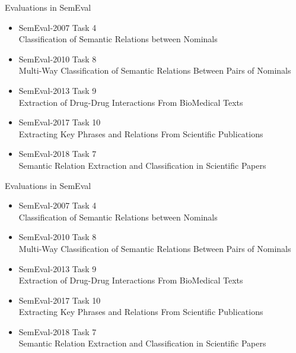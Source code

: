 \documentclass[xcolor={dvipsnames}]{beamer}
\begin{document}
\begin{frame}{\insertsection}

\begin{exampleblock}{Evaluations in SemEval}
		\begin{itemize}
			\small 
			\item SemEval-2007 Task 4 \\ Classification of Semantic Relations between Nominals
			\item SemEval-2010 Task 8 \\ Multi-Way Classification of Semantic Relations Between Pairs of Nominals
			\item SemEval-2013 Task 9 \\ Extraction of Drug-Drug Interactions From BioMedical Texts
			\item SemEval-2017 Task 10 \\ Extracting Key Phrases and Relations From Scientific Publications
			\item SemEval-2018 Task 7 \\ Semantic Relation Extraction and Classification in Scientific Papers
		\end{itemize}
\end{exampleblock}
\end{frame}

\begin{frame}{\insertsection}

\begin{exampleblock}{Evaluations in SemEval}
		\begin{itemize}
			\small 
			\item SemEval-2007 Task 4 \\ Classification of Semantic Relations between Nominals
			\item \alert{SemEval-2010 Task 8 \\ Multi-Way Classification of Semantic Relations Between Pairs of Nominals}
			\item SemEval-2013 Task 9 \\ Extraction of Drug-Drug Interactions From BioMedical Texts
			\item SemEval-2017 Task 10 \\ Extracting Key Phrases and Relations From Scientific Publications
			\item SemEval-2018 Task 7 \\ Semantic Relation Extraction and Classification in Scientific Papers
		\end{itemize}
\end{exampleblock}
\end{frame}
\end{document}
